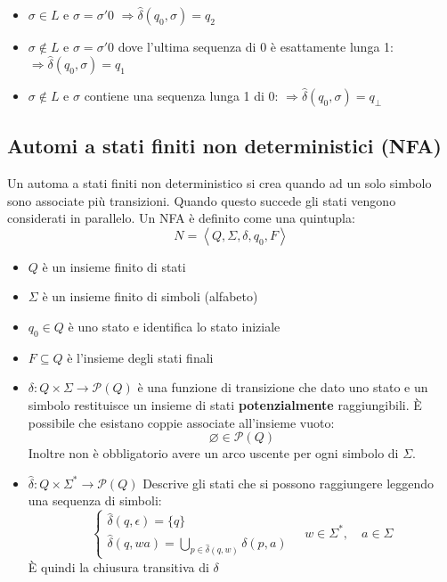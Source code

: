 \documentclass[a4paper]{article}
\begin{document}
\begin{exercise}
\begin{itemize}
    \item \( \sigma \in L \) e \( \sigma = \sigma'0 \) 
      \(
        \Rightarrow \hat{\delta}(q_0, \sigma) = q_2
      \) 

    \item \( \sigma \notin L \) e \( \sigma = \sigma'0 \) dove l'ultima sequenza di 0
      è esattamente lunga 1:
      \(
        \Rightarrow \hat{\delta}(q_0, \sigma) = q_1
      \) 

    \item \( \sigma \notin L \) e \( \sigma  \) contiene una sequenza lunga 1 di 0:
      \(
        \Rightarrow \hat{\delta}(q_0, \sigma) = q_{\bot}
      \)
  \end{itemize}
\end{exercise}

\subsection{Automi a stati finiti non deterministici (NFA)}
Un automa a stati finiti non deterministico si crea quando ad un solo simbolo sono
associate più transizioni. Quando questo succede gli stati vengono considerati in
parallelo. Un NFA è definito come una quintupla:
\[
  N = \left< Q, \Sigma, \delta, q_0, F \right>
\] 
\begin{itemize}
  \item \( Q \) è un insieme finito di stati
  \item \( \Sigma  \) è un insieme finito di simboli (alfabeto)
  \item \( q_0 \in Q \) è uno stato e identifica lo stato iniziale
  \item \( F \subseteq Q \) è l'insieme degli stati finali
  \item \( \delta: Q \times \Sigma \to \mathcal{P}(Q) \) è una funzione di transizione che
    dato uno stato e un simbolo restituisce un insieme di stati \textbf{potenzialmente}
    raggiungibili. È possibile che esistano coppie associate all'insieme vuoto:
    \[
      \varnothing \in \mathcal{P}(Q)
    \] 
    Inoltre non è obbligatorio avere un arco uscente per ogni simbolo di \( \Sigma \).
  \item \( \hat{\delta}: Q \times \Sigma^* \to \mathcal{P}(Q) \) Descrive gli stati che si possono
    raggiungere leggendo una sequenza di simboli:
    \[
      \begin{cases}
        \hat{\delta}(q, \epsilon) = \{q\}\\
        \hat{\delta}(q, wa) = \bigcup_{p \in \hat{\delta}(q,w)} \delta(p, a)
      \end{cases}
      \quad
      w \in \Sigma^*, \quad a \in \Sigma 
    \] 
    È quindi la chiusura transitiva di \( \delta \)
\end{itemize}
\end{document}
